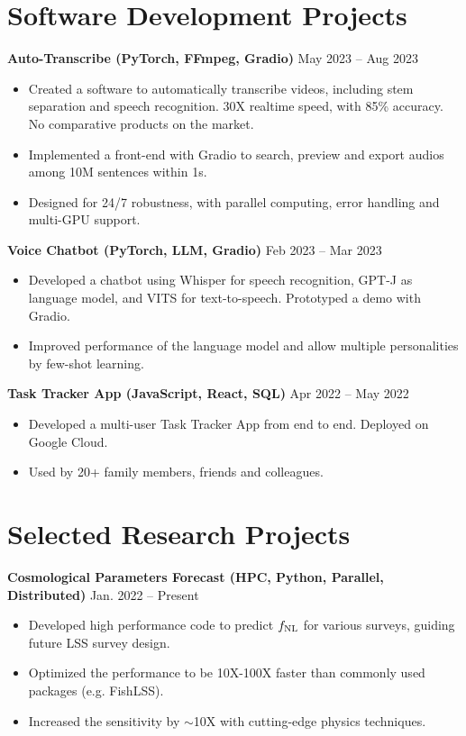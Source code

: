 \documentclass[letterpaper,12pt]{article}
\newenvironment{zitemize}{
\begin{itemize} \vspace{-.8em}\itemsep 0pt \parskip 0pt}
{\end{itemize}\vspace{-.7em}}
\newcommand{\proglang}[1]{#1}
\begin{document}
\section{Software Development Projects}
\textbf{Auto-Transcribe (PyTorch, FFmpeg, Gradio)} \hfill May 2023 -- Aug 2023 \\
\begin{zitemize}
    \item Created a software to automatically transcribe videos, including stem separation and speech recognition. 30X realtime speed, with 85\% accuracy. No comparative products on the market.
    \item Implemented a front-end with \proglang{Gradio} to search, preview and export audios among 10M sentences within 1s.
    \item Designed for 24/7 robustness, with parallel computing, error handling and multi-GPU support.
\end{zitemize}

\textbf{Voice Chatbot (PyTorch, LLM, Gradio)} \hfill Feb 2023 -- Mar 2023 \\
\begin{zitemize}
    \item Developed a chatbot using \proglang{Whisper} for speech recognition, \proglang{GPT-J} as language model, and \proglang{VITS} for text-to-speech. Prototyped a demo with \proglang{Gradio}.
    \item Improved performance of the language model and allow multiple personalities by few-shot learning.
\end{zitemize}

\textbf{Task Tracker App (JavaScript, React, SQL)} \hfill Apr 2022 -- May 2022 \\
\begin{zitemize}
    \item Developed a multi-user Task Tracker App from end to end. Deployed on \proglang{Google Cloud}.
    \item Used by 20+ family members, friends and colleagues.
\end{zitemize}


\section{Selected Research Projects}
\textbf{Cosmological Parameters Forecast (HPC, Python, Parallel, Distributed)} \hfill Jan. 2022 -- Present \\
\begin{zitemize}
    \item Developed high performance code to predict $f_{\rm NL}$ for various surveys, guiding future LSS survey design.
    \item Optimized the performance to be 10X-100X faster than commonly used packages (e.g. FishLSS).
    \item Increased the sensitivity by $\sim$10X with cutting-edge physics techniques.
\end{zitemize}
\end{document}
